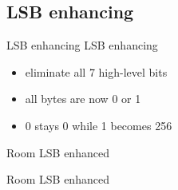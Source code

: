 \subsection{LSB enhancing}
\begin{frame}{LSB enhancing}
	LSB enhancing
	\begin{itemize}
		\item eliminate all 7 high-level bits
		\item all bytes are now 0 or 1
		\item 0 stays 0 while 1 becomes 256
	\end{itemize}
\end{frame}

\begin{frame}{Room LSB enhanced}
\begin{figure}
\centering
{}
\end{figure}
\end{frame}

\begin{frame}{Room LSB enhanced}
\begin{figure}
\centering
{}
\end{figure}
\end{frame}

